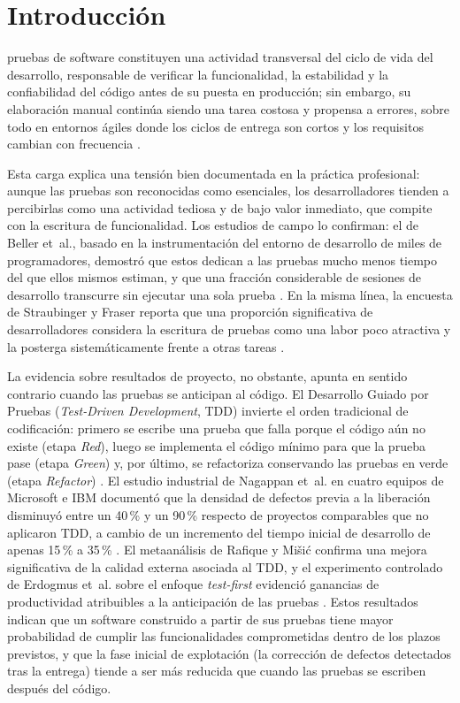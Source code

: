 \documentclass[10pt,journal,twoside,letterpaper]{IEEEtran}
\begin{document}
    \section{Introducción}
    \label{sec:introduccion}
    
     pruebas de software constituyen una actividad transversal del ciclo de vida del desarrollo, responsable de verificar la funcionalidad, la estabilidad y la confiabilidad del código antes de su puesta en producción; sin embargo, su elaboración manual continúa siendo una tarea costosa y propensa a errores, sobre todo en entornos ágiles donde los ciclos de entrega son cortos y los requisitos cambian con frecuencia \cite{lukasczyk2023empirical,wang2024survey}.
    
    Esta carga explica una tensión bien documentada en la práctica profesional: aunque las pruebas son reconocidas como esenciales, los desarrolladores tienden a percibirlas como una actividad tediosa y de bajo valor inmediato, que compite con la escritura de funcionalidad. Los estudios de campo lo confirman: el de Beller et~al., basado en la instrumentación del entorno de desarrollo de miles de programadores, demostró que estos dedican a las pruebas mucho menos tiempo del que ellos mismos estiman, y que una fracción considerable de sesiones de desarrollo transcurre sin ejecutar una sola prueba \cite{beller2015test}. En la misma línea, la encuesta de Straubinger y Fraser reporta que una proporción significativa de desarrolladores considera la escritura de pruebas como una labor poco atractiva y la posterga sistemáticamente frente a otras tareas \cite{straubinger2023survey}.
    
    La evidencia sobre resultados de proyecto, no obstante, apunta en sentido contrario cuando las pruebas se anticipan al código. El Desarrollo Guiado por Pruebas (\emph{Test-Driven Development}, TDD) invierte el orden tradicional de codificación: primero se escribe una prueba que falla porque el código aún no existe (etapa \emph{Red}), luego se implementa el código mínimo para que la prueba pase (etapa \emph{Green}) y, por último, se refactoriza conservando las pruebas en verde (etapa \emph{Refactor}) \cite{beck2003tdd}. El estudio industrial de Nagappan et~al. en cuatro equipos de Microsoft e IBM documentó que la densidad de defectos previa a la liberación disminuyó entre un 40\,\% y un 90\,\% respecto de proyectos comparables que no aplicaron TDD, a cambio de un incremento del tiempo inicial de desarrollo de apenas 15\,\% a 35\,\% \cite{nagappan2008tdd}. El metaanálisis de Rafique y Mišić confirma una mejora significativa de la calidad externa asociada al TDD, y el experimento controlado de Erdogmus et~al. sobre el enfoque \emph{test-first} evidenció ganancias de productividad atribuibles a la anticipación de las pruebas \cite{rafique2013meta,erdogmus2005testfirst}. Estos resultados indican que un software construido a partir de sus pruebas tiene mayor probabilidad de cumplir las funcionalidades comprometidas dentro de los plazos previstos, y que la fase inicial de explotación (la corrección de defectos detectados tras la entrega) tiende a ser más reducida que cuando las pruebas se escriben después del código.
    
\end{document}
